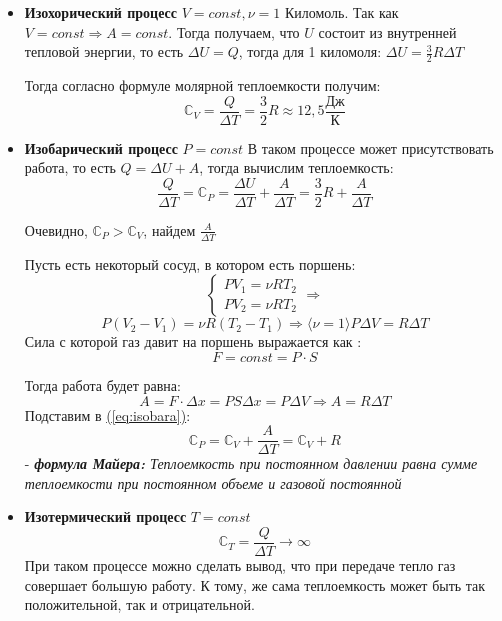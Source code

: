 \documentclass[12pt,a4paper]{report}
\begin{document}
\begin{itemize}
    \item \textbf{Изохорический процесс} $ V = const , \nu  = 1$ Киломоль. Так как $V = const \Rightarrow A = const$. Тогда получаем, что $U$ состоит из внутренней тепловой энергии, то есть $\Delta U = Q$, тогда для 1 киломоля: $\Delta U = \frac{3}{2}R \Delta T$

          Тогда согласно формуле молярной теплоемкости получим:
          \[ \mathbb{C}_V = \frac{Q}{\Delta T} = \frac{3}{2}R \approx 12,5 \frac{\text{Дж}}{\text{К}} \]

    \item \textbf{Изобарический процесс} $P = const$
          В таком процессе может присутствовать работа, то есть $Q = \Delta U + A$, тогда вычислим теплоемкость:
          \begin{equation}\label{eq:isobara}
              \frac{Q}{\Delta T} = \mathbb{C}_P = \frac{\Delta U}{\Delta T} + \frac{A}{\Delta T} = \frac{3}{2}R + \frac{A}{\Delta T}
          \end{equation}

          Очевидно, $\mathbb{C}_P > \mathbb{C}_V$, найдем $ \frac{A}{\Delta T}$

          Пусть есть некоторый сосуд, в котором есть поршень:
          \[
              \begin{cases}
                  PV_1 = \nu R T_2 \\
                  PV_2 = \nu R T_2
              \end{cases}
              \Rightarrow \]
          \[ P(V_2 - V_1) = \nu R (T_2 - T_1) \Rightarrow \langle \nu = 1 \rangle P \Delta V = R \Delta T\]
          Сила с которой газ давит на поршень выражается как :
          \[ F = const = P \cdot S\]

          Тогда работа будет равна:
          \[ A = F \cdot \Delta x = PS\Delta x = P \Delta V \Rightarrow A = R \Delta T\]
          Подставим в \hyperref[eq:isobara]{(\ref{eq:isobara})}:
          \[ \mathbb{C}_P = \mathbb{C}_V + \frac{A}{\Delta T} = \mathbb{C}_V + R\]
          - \textit{\textbf{формула Майера:} Теплоемкость при постоянном давлении равна сумме теплоемкости при постоянном объеме и газовой постоянной}
    \item \textbf{Изотермический процесс} $T = const$
          \[ \mathbb{C}_T = \frac{Q}{\Delta T} \to \infty \]
          При таком процессе можно сделать вывод, что при передаче тепло газ совершает большую работу. К тому, же сама теплоемкость может быть так положительной, так и отрицательной.
\end{itemize}
\end{document}
